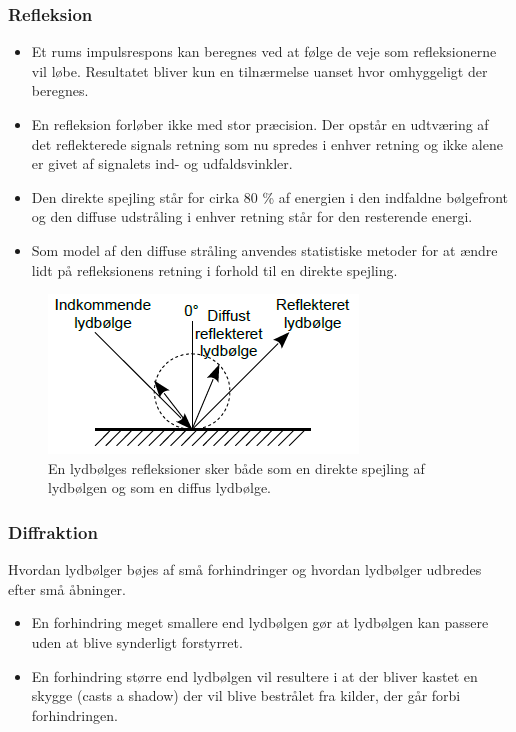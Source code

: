 \subsubsection{Refleksion}
\begin{itemize}
	\item Et rums impulsrespons kan beregnes ved at følge de veje som refleksionerne vil løbe. Resultatet bliver kun en tilnærmelse uanset hvor omhyggeligt der beregnes.
	\item En refleksion forløber ikke med stor præcision. Der opstår en udtværing af det reflekterede signals retning som nu spredes i enhver retning og ikke alene er givet af signalets ind- og udfaldsvinkler.
	\item Den direkte spejling står for cirka 80 \% af energien i den
	indfaldne bølgefront og den diffuse udstråling i enhver retning står for den resterende energi.
	\item Som model af den diffuse stråling anvendes statistiske metoder for at ændre lidt på refleksionens retning i forhold til en direkte spejling.
\end{itemize}

\begin{figure} [H]
	\centering
	\includegraphics[width=.55\linewidth]{graphics/14.png}
	\caption{En lydbølges refleksioner sker både som en direkte spejling af lydbølgen og som en diffus lydbølge.}
	\label{fig:14}
\end{figure}

\subsubsection{Diffraktion}
Hvordan lydbølger bøjes af små forhindringer og hvordan lydbølger udbredes efter små åbninger. 

\begin{itemize}
	\item En forhindring meget smallere end lydbølgen gør at lydbølgen kan passere uden at blive synderligt forstyrret.
	\item En forhindring større end lydbølgen vil resultere i at der bliver kastet en skygge (casts a shadow) der vil  blive bestrålet fra kilder, der går forbi forhindringen.
\end{itemize}

